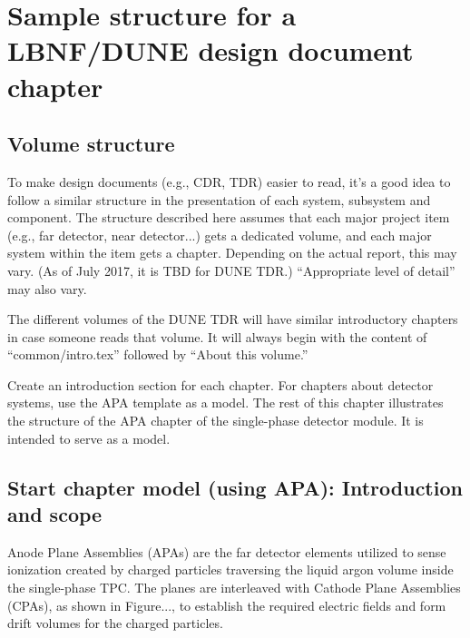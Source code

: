\chapter{Sample structure for a LBNF/DUNE design document chapter}
\label{sec:design-doc}

\section{Volume structure}

To make design documents (e.g., CDR, TDR) easier to read, it's a good idea to follow a similar structure in the presentation of each system, subsystem and component. The structure described here assumes that each major project item (e.g., far detector, near detector...) gets a dedicated volume, and each major system within the item gets a chapter.  Depending on the actual report, this may vary. (As of July 2017, it is TBD for DUNE TDR.) ``Appropriate level of detail'' may also vary.

The different volumes of the DUNE TDR will have similar introductory chapters in case someone reads that volume.  
It will always begin with the content of ``common/intro.tex'' followed by ``About this volume.''

Create an introduction section for each chapter.  For chapters about detector systems, use the APA template as a model.
The rest of this chapter illustrates the structure of the APA chapter of the single-phase detector module. It is intended to serve as a model.

\section{Start chapter model (using APA): Introduction and scope}
\label{apa:intro-scope}

Anode Plane Assemblies (APAs) are the far detector elements utilized to sense ionization created by
charged particles traversing the liquid argon volume inside the single-phase TPC. The planes are interleaved with Cathode Plane Assemblies (CPAs), as shown in Figure..., to establish the required electric fields and form drift volumes for the charged particles. 


